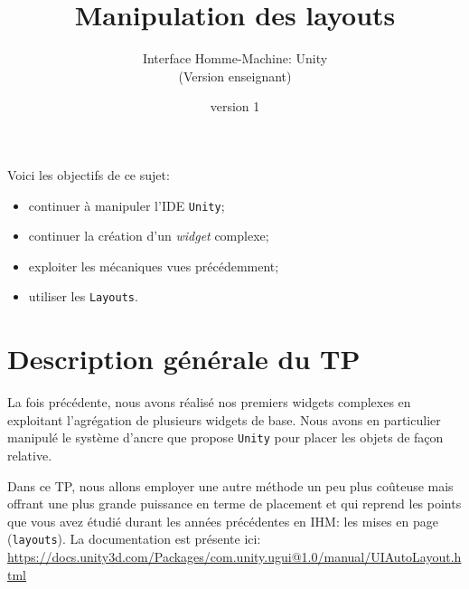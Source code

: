 \documentclass[a4paper,10pt]{article}
\newenvironment{attention}%
{\begin{tcolorbox}[breakable,colback=green!25!white,colframe=red!55!black,title=Attention]}%
{\end{tcolorbox}}
\begin{document}
	


\title{\vspace*{-1cm}Manipulation des layouts}
\author{\vspace*{-1.5cm}Interface Homme-Machine: Unity
\begin{ensnote}
	(Version enseignant)
\end{ensnote}
}
\date{\vspace*{-1.5cm}version 1}
\maketitle
\thispagestyle{fancy}

Voici les objectifs de ce sujet:
\begin{itemize}
	\item continuer à manipuler l'IDE \texttt{Unity};
	\item continuer la création d'un \textit{widget} complexe;
	\item exploiter les mécaniques vues précédemment;
	\item utiliser les \texttt{Layouts}.
\end{itemize}


%	

\section{Description générale du TP}

La fois précédente, nous avons réalisé nos premiers widgets complexes en exploitant l'agrégation de plusieurs widgets de base. Nous avons en particulier manipulé le système d'ancre que propose \texttt{Unity} pour placer les objets de façon relative.

Dans ce TP, nous allons employer une autre méthode un peu plus coûteuse mais offrant une plus grande puissance en terme de placement et qui reprend les points que vous avez étudié durant les années précédentes en IHM: les mises en page (\texttt{layouts}). La documentation est présente ici: \url{https://docs.unity3d.com/Packages/com.unity.ugui@1.0/manual/UIAutoLayout.html}
\end{document}
